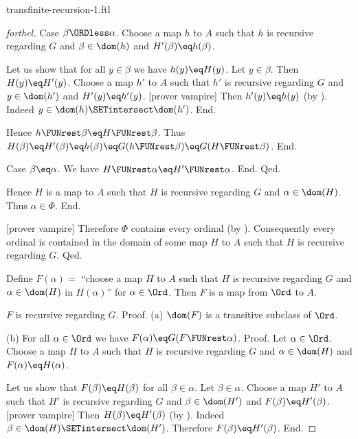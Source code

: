 \documentclass{naproche-library}
\begin{document}
\begin{smodule}[title=Transfinite Recursion I]{transfinite-recursion-1.ftl}
\begin{proof}[forthel]
        Case $\beta \ORDless \alpha$.
          Choose a map $h$ to $A$ such that $h$ is recursive regarding $G$ and $\beta \in \dom(h)$ and $H'(\beta) \eq h(\beta)$.

          Let us show that for all $y \in \beta$ we have $h(y) \eq H(y)$.
            Let $y \in \beta$.
            Then $H(y) \eq H'(y)$.
            Choose a map $h'$ to $A$ such that $h'$ is recursive regarding $G$ and $y \in \dom(h')$ and $H'(y) \eq h'(y)$.
            [prover vampire]
            Then $h'(y) \eq h(y)$ (by ).
            Indeed $y \in \dom(h) \SETintersect \dom(h')$.
          End.

          Hence $h \FUNrest \beta \eq H \FUNrest \beta$.
          Thus $H(\beta)
            \eq H'(\beta)
            \eq h(\beta)
            \eq G(h \FUNrest \beta)
            \eq G(H \FUNrest \beta)$.
        End.

        Case $\beta \eq \alpha$.
          We have $H \FUNrest \alpha \eq H' \FUNrest \alpha$.
        End.
      Qed.

      Hence $H$ is a map to $A$ such that $H$ is recursive regarding $G$ and $\alpha \in \dom(H)$.
      Thus $\alpha \in \Phi$.
    End.

    [prover vampire]
    Therefore $\Phi$ contains every ordinal (by ).
    Consequently every ordinal is contained in the domain of some map $H$ to $A$ such that $H$ is recursive regarding $G$.
  Qed.

  Define $F(\alpha) =$ ``choose a map $H$ to $A$ such that $H$ is recursive regarding $G$ and $\alpha \in \dom(H)$ in $H(\alpha)$'' for $\alpha \in \Ord$.
  Then $F$ is a map from $\Ord$ to $A$.

  $F$ is recursive regarding $G$. \newline
  Proof.
    (a) $\dom(F)$ is a transitive subclass of $\Ord$.

    (b) For all $\alpha \in \Ord$ we have $F(\alpha) \eq G(F \FUNrest \alpha)$. \newline
    Proof.
      Let $\alpha \in \Ord$.
      Choose a map $H$ to $A$ such that $H$ is recursive regarding $G$ and $\alpha \in \dom(H)$ and $F(\alpha) \eq H(\alpha)$.

      Let us show that $F(\beta) \eq H(\beta)$ for all $\beta \in \alpha$.
        Let $\beta \in \alpha$.
        Choose a map $H'$ to $A$ such that $H'$ is recursive regarding $G$ and $\beta \in \dom(H')$ and $F(\beta) \eq H'(\beta)$.
        [prover vampire]
        Then $H(\beta) \eq H'(\beta)$ (by ).
        Indeed $\beta \in \dom(H) \SETintersect \dom(H')$.
        Therefore $F(\beta) \eq H'(\beta)$.
      End.


\end{proof}
\end{smodule}
\end{document}

